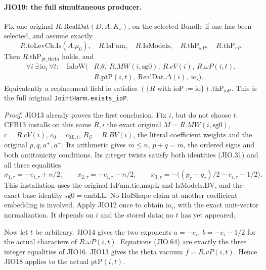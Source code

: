 \paragraph{JIO19: the full simultaneous producer.}
\label{claim:JIO19}
Fix one original
\(R:\mathrm{RealDat}(D,A,K_s)\), on the selected Bundle if
one has been selected, and assume exactly
\[
 R.\mathrm{toLevCh}.\mathrm{Is}(A.\mu_0),\quad
 R.\mathrm{IsFam},\quad R.\mathrm{IsModels},\quad
 R.\mathrm{thP}_{\omega P},\quad R.\mathrm{thP}_{vP}.
 \tag{JIO.62}
\]
Then \(R.\mathrm{thP}_{\mathrm{pt\_theta}}\) holds, and
\[
 \begin{split}
 \forall i\ \exists\,\mathrm{io}_i\ \forall t:\quad
 \mathrm{IsIoW}\bigl(&R.\theta,\ R.MW(i,\mathrm{sg0}),\
        R.cV(i),\ R.\omega P(i,t),\\
                   &R.\mathrm{ptP}(i,t),\
                     \mathrm{RealDat}.\Delta(i),\
                     \mathrm{io}_i\bigr).
 \end{split}
 \tag{JIO.63}
\]
Equivalently a replacement field \(\mathrm{io}\) satisfies
\((\{R\text{ with ioP}:=\mathrm{io}\}).\mathrm{thP}_{\mathrm{ioP}}\).
This is the full original \texttt{JointHarm.exists\_ioP}.

\emph{Proof.}
JIO13 already proves the first conclusion.
Fix \(i\), but do not choose \(t\).
CFB13 installs on this same \(R,i\) the exact original
\(M=R.MW(i,\mathrm{sg0})\), \(c=R.cV(i)\), \(c_0=c_{0L,i}\),
\(B_S=R.BV(i)\), the literal coefficient weights and the
original \(p,q,a^+,a^-\).  Its arithmetic gives
\(m\le n\), \(p+q=m\), the ordered signs and both
antitonicity conditions.  Its integer twists satisfy both
identities (JIO.31) and all three equalities
\[
 x_{1,\tau}=-e_{i,\tau}+n/2,\qquad
 x_{2,\tau}=-e_{i,\tau}-n/2,\qquad
 x_{3,\tau}=-\bigl((p_\tau-q_\tau)/2-e_{i,\tau}-1/2\bigr).
 \tag{JIO.64}
\]
This installation uses the original \(\mathrm{IsFam.tie.mapL}\)
and \(\mathrm{IsModels.BV}\), and the exact base identity
\(\mathrm{sg0}=\mathrm{embLL}\).  No HolShape claim at another
coefficient embedding is involved.
Apply JIO12 once to obtain \(\mathrm{io}_i\), with the exact
unit-vector normalization.  It depends on \(i\) and the
stored data; no \(t\) has yet appeared.

Now let \(t\) be arbitrary.  JIO14 gives the two exponents
\(a=-e_i\), \(b=-e_i-1/2\) for the actual characters of
\(R.\omega P(i,t)\).  Equations (JIO.64) are exactly the
three integer equalities of JIO16.  JIO13 gives the theta
vacuum \(f=R.vP(i,t)\).  Hence JIO18 applies to the actual
\(\mathrm{ptP}(i,t)\).

